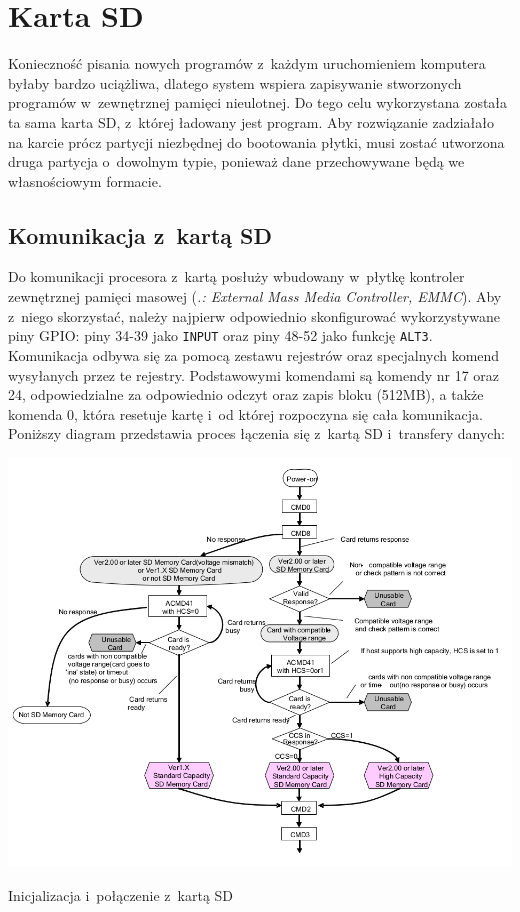 \documentclass[shortabstract]{iithesis}
\begin{document}
\section{Karta SD}
Konieczność pisania nowych programów z~każdym uruchomieniem komputera byłaby bardzo uciążliwa, dlatego system wspiera zapisywanie stworzonych programów w~zewnętrznej pamięci nieulotnej. Do tego celu wykorzystana została ta sama karta SD, z~której ładowany jest program. Aby rozwiązanie zadziałało na karcie prócz partycji niezbędnej do bootowania płytki, musi zostać utworzona druga partycja o~dowolnym typie, ponieważ dane przechowywane będą we własnościowym formacie. 
\subsection{Komunikacja z~kartą SD}
Do komunikacji procesora z~kartą posłuży wbudowany w~płytkę kontroler zewnętrznej pamięci masowej (\textit{.: External Mass Media Controller, EMMC}). Aby z~niego skorzystać, należy najpierw odpowiednio skonfigurować wykorzystywane piny GPIO: piny 34-39 jako \texttt{INPUT} oraz piny 48-52 jako funkcję \texttt{ALT3}. Komunikacja odbywa się za pomocą zestawu rejestrów oraz specjalnych komend wysyłanych przez te rejestry. Podstawowymi komendami są komendy nr 17 oraz 24, odpowiedzialne za odpowiednio odczyt oraz zapis bloku (512MB), a także komenda 0, która resetuje kartę i~od której rozpoczyna się cała komunikacja.
Poniższy diagram przedstawia proces łączenia się z~kartą SD i~transfery danych:

\begingroup
\centering
\includegraphics[width=\textwidth]{sd-connection.png}
\captionsetup{type=figure}
\caption{Inicjalizacja i~połączenie z~kartą SD}
\endgroup
\end{document}
